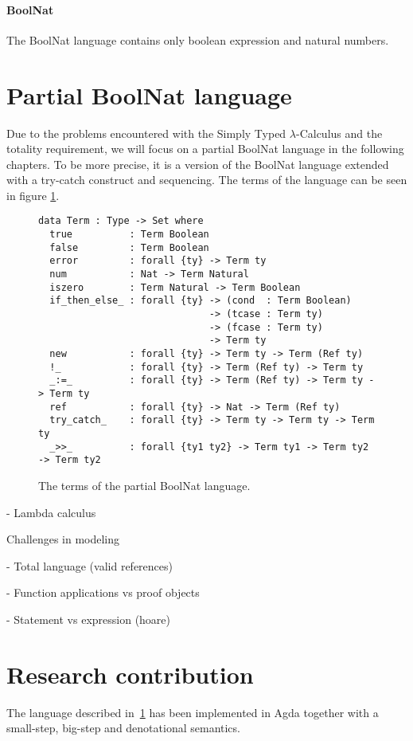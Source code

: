 \documentclass[12pt, a4paper, oneside]{article}
\begin{document}
\paragraph{BoolNat}
The BoolNat language contains only boolean expression and natural numbers.

\section{Partial BoolNat language}
\label{sec:boolnat}

Due to the problems encountered with the Simply Typed $\lambda$-Calculus and the totality requirement, we will focus on a partial BoolNat
language in the following chapters. To be more precise, it is a version of the BoolNat language extended with a try-catch construct and 
sequencing. The terms of the language can be seen in figure \ref{lst:part-boolnat-term}.

\begin{figure}
\begin{lstlisting}
data Term : Type -> Set where
  true          : Term Boolean
  false         : Term Boolean
  error         : forall {ty} -> Term ty 
  num           : Nat -> Term Natural
  iszero        : Term Natural -> Term Boolean
  if_then_else_ : forall {ty} -> (cond  : Term Boolean)
                              -> (tcase : Term ty)
                              -> (fcase : Term ty)
                              -> Term ty
  new           : forall {ty} -> Term ty -> Term (Ref ty)
  !_            : forall {ty} -> Term (Ref ty) -> Term ty
  _:=_          : forall {ty} -> Term (Ref ty) -> Term ty -> Term ty
  ref           : forall {ty} -> Nat -> Term (Ref ty)
  try_catch_    : forall {ty} -> Term ty -> Term ty -> Term ty
  _>>_          : forall {ty1 ty2} -> Term ty1 -> Term ty2 -> Term ty2
\end{lstlisting}
\caption{The terms of the partial BoolNat language.}
\label{lst:part-boolnat-term}
\end{figure}




		- Lambda calculus

		Challenges in modeling

			- Total language (valid references)

			- Function applications vs proof objects

			- Statement vs expression (hoare)


\section{Research contribution}
\label{sec:cont}
The language described in~\ref{sec:boolnat} has been implemented in Agda together with a small-step, big-step and denotational semantics.
\end{document}
